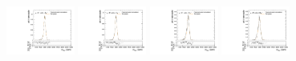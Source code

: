 \begin{figure}[htpb]
  \centering
  \includegraphics[width=0.2\textwidth]{fig/2Dfit/templateVsReco_ZprToWW2000_r0_MVV_mu_HP_nobb_LDy_linear.pdf}
  \includegraphics[width=0.2\textwidth]{fig/2Dfit/templateVsReco_ZprToWW2000_r0_MVV_mu_LP_nobb_LDy_linear.pdf}
  \includegraphics[width=0.2\textwidth]{fig/2Dfit/templateVsReco_ZprToWW2000_r0_MVV_mu_HP_nobb_HDy_linear.pdf}
  \includegraphics[width=0.2\textwidth]{fig/2Dfit/templateVsReco_ZprToWW2000_r0_MVV_mu_LP_nobb_HDy_linear.pdf}\\

\end{figure}
